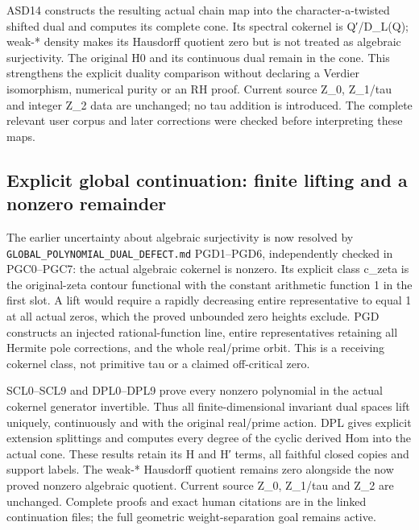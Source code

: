 ASD14 constructs the resulting actual chain map into the
character-a-twisted shifted dual and computes its complete cone. Its
spectral cokernel is Q′/D\_L(Q); weak-* density makes its Hausdorff
quotient zero but is not treated as algebraic surjectivity. The original
H0 and its continuous dual remain in the cone. This strengthens the
explicit duality comparison without declaring a Verdier isomorphism,
numerical purity or an RH proof. Current source Z\_0, Z\_1/tau and
integer Z\_2 data are unchanged; no tau addition is introduced. The
complete relevant user corpus and later corrections were checked before
interpreting these maps.

\subsection{Explicit global continuation: finite lifting and a nonzero
remainder}\label{explicit-global-continuation-finite-lifting-and-a-nonzero-remainder-occurrence-2}

The earlier uncertainty about algebraic surjectivity is now resolved by
\nolinkurl{GLOBAL_POLYNOMIAL_DUAL_DEFECT.md} PGD1--PGD6, independently checked in
PGC0--PGC7: the actual algebraic cokernel is nonzero. Its explicit class
c\_zeta is the original-zeta contour functional with the constant
arithmetic function 1 in the first slot. A lift would require a rapidly
decreasing entire representative to equal 1 at all actual zeros, which
the proved unbounded zero heights exclude. PGD constructs an injected
rational-function line, entire representatives retaining all Hermite
pole corrections, and the whole real/prime orbit. This is a receiving
cokernel class, not primitive tau or a claimed off-critical zero.

SCL0--SCL9 and DPL0--DPL9 prove every nonzero polynomial in the actual
cokernel generator invertible. Thus all finite-dimensional invariant
dual spaces lift uniquely, continuously and with the original real/prime
action. DPL gives explicit extension splittings and computes every
degree of the cyclic derived Hom into the actual cone. These results
retain its H and H′ terms, all faithful closed copies and support
labels. The weak-* Hausdorff quotient remains zero alongside the now
proved nonzero algebraic quotient. Current source Z\_0, Z\_1/tau and
Z\_2 are unchanged. Complete proofs and exact human citations are in the
linked continuation files; the full geometric weight-separation goal
remains active.
